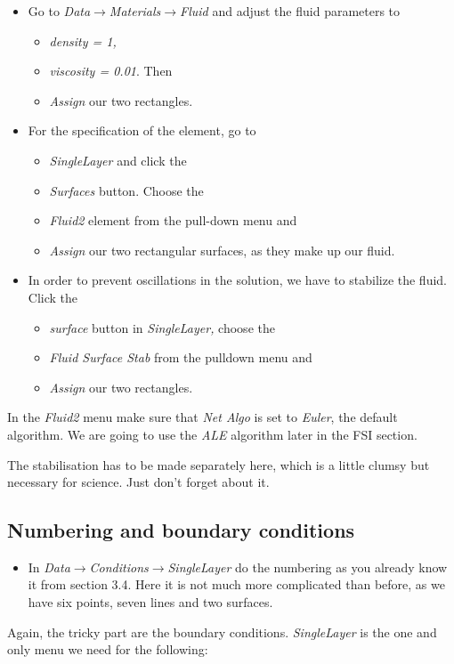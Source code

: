 \begin{itemize}
\item Go to \emph{Data$\to$Materials$\to$Fluid} and adjust the fluid parameters
to 

\begin{itemize}
\item \emph{density = 1, }
\item \emph{viscosity = 0.01}. Then 
\item \emph{Assign} our two rectangles. 
\end{itemize}
\item For the specification of the element, go to 

\begin{itemize}
\item \emph{SingleLayer} and click the 
\item \emph{Surfaces} button. Choose the 
\item \emph{Fluid2} element from the pull-down menu and 
\item \emph{Assign} our two rectangular surfaces, as they make up our fluid.
\end{itemize}
\item In order to prevent oscillations in the solution, we have to stabilize
the fluid. Click the 

\begin{itemize}
\item \emph{surface} button in \emph{SingleLayer,} choose the 
\item \emph{Fluid Surface Stab} from the pulldown menu and
\item \emph{Assign} our two rectangles.
\end{itemize}
\end{itemize}
In the \emph{Fluid2} menu make sure that \emph{Net Algo} is set to
\emph{Euler}, the default algorithm. We are going to use the \emph{ALE}
algorithm later in the FSI section.

The stabilisation has to be made separately here, which is a little
clumsy but necessary for science. Just don't forget about it.


\subsection{Numbering and boundary conditions}

\begin{itemize}
\item In \emph{Data$\to$Conditions$\to$SingleLayer} do the numbering as
you already know it from section 3.4. Here it is not much more complicated
than before, as we have six points, seven lines and two surfaces.
\end{itemize}
Again, the tricky part are the boundary conditions. \emph{SingleLayer}
is the one and only menu we need for the following:

